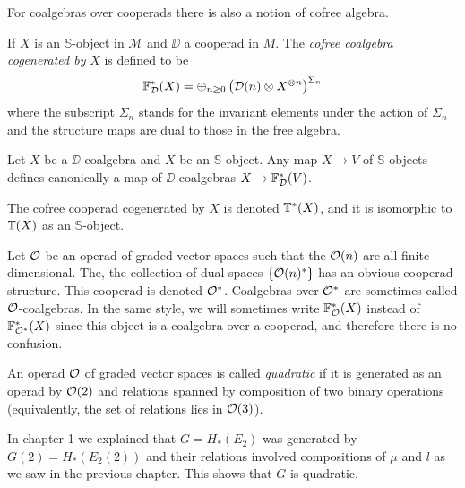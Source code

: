 \documentclass[TFM.tex]{subfiles}
\begin{document}
For coalgebras over cooperads there is also a notion of cofree algebra. 

\begin{defi}
If $X$ is an $\mathbb{S}$-object in $\mathscr{M}$ and $\DD$ a cooperad in $M$. The \emph{cofree coalgebra cogenerated by }$X$ is defined to be
\[
\mathbb{F}^*_{\mathcal{D}}(X)=\oplus_{n\geq 0}\left(\mathcal{D}(n)\otimes X^{\otimes n}\right)^{\Sigma_n}
\]
where the subscript $\Sigma_n$ stands for the invariant elements under the action of $\Sigma_n$ and the structure maps are dual to those in the free algebra. %
\end{defi}



Let $X$ be a $\DD$-coalgebra and $X$ be an $\mathbb{S}$-object. Any map $X\to V$ of $\mathbb{S}$-objects defines canonically a map of $\DD$-coalgebras $X\to \mathbb{F}_{\mathcal{D}}^*(V)$.  

The cofree cooperad cogenerated by $X$ is denoted $\mathbb{T}^*(X)$, and it is isomorphic to $\mathbb{T}(X)$ as an $\mathbb{S}$-object. 

\begin{remark}\label{dual}
Let ${\mathcal O}$ be an operad of graded vector spaces such that the ${\mathcal O}(n)$ are all finite dimensional. The, the collection of dual spaces $\{{\mathcal O}(n)^*\}$ has an obvious cooperad structure. This cooperad is denoted ${\mathcal O}^*$. Coalgebras over ${\mathcal O}^*$ are sometimes called ${\mathcal O}$-coalgebras. In the same style, we will sometimes write $\mathbb{F}^*_{\mathcal O}(X)$ instead of $\mathbb{F}^*_{{\mathcal O}^*}(X)$ since this object is a coalgebra over a cooperad, and therefore there is no confusion.
\end{remark}

\begin{defi}
An operad ${\mathcal O}$ of graded vector spaces is called \emph{quadratic} if it is generated as an operad by ${\mathcal O}(2)$ and relations spanned by composition of two binary operations (equivalently, the set of relations lies in ${\mathcal O}(3)$). 
\end{defi}

In chapter 1 we explained that $G=H_*(E_2)$ was generated by $G(2)=H_*(E_2(2))$ and their relations involved compositions of $\mu$ and $l$ as we saw in the previous chapter. This shows that $G$ is quadratic. %
\end{document}
